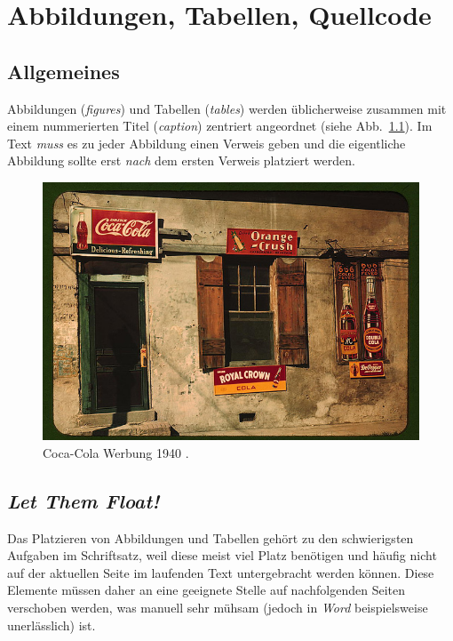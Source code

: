 \chapter{Abbildungen, Tabellen, Quellcode}
\label{chap:Abbildungen}

\section{Allgemeines}

Abbildungen (\emph{figures}) und Tabellen (\emph{tables}) werden üblicherweise
zusammen mit einem nummerierten Titel (\emph{caption}) zentriert
angeordnet (siehe Abb.~\ref{fig:CocaCola}).
Im Text \emph{muss} es zu jeder Abbildung einen Verweis geben und die eigentliche Abbildung
sollte erst \emph{nach} dem ersten Verweis platziert werden.

\begin{figure}
\centering
\includegraphics[width=.95\textwidth]{cola-public-domain-photo-p} %
\caption{Coca-Cola Werbung 1940 \cite{CocaCola1940}.}
\label{fig:CocaCola}
\end{figure}



\section{\emph{Let Them Float!}}

Das Platzieren von Abbildungen und Tabellen gehört zu den
schwierigsten Aufgaben im Schriftsatz, weil diese meist viel Platz
benötigen und häufig nicht auf der aktuellen Seite im laufenden
Text untergebracht werden können. Diese Elemente müssen daher an
eine geeignete Stelle auf nachfolgenden Seiten verschoben werden,
was manuell sehr mühsam (jedoch in \emph{Word} beispielsweise unerlässlich) ist.

